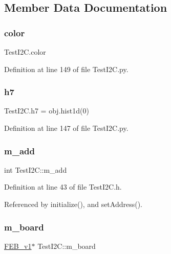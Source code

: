 \subsection{Member Data Documentation}
\mbox{\label{classTestI2C_ad56430c679e365a4b3c7e313119937ae}} 
\subsubsection{\texorpdfstring{color}{color}}
{\footnotesize\ttfamily Test\+I2\+C.\+color}



Definition at line 149 of file Test\+I2\+C.\+py.

\mbox{\label{classTestI2C_a5810c36ed7c1f23edaf77264084b005f}} 
\subsubsection{\texorpdfstring{h7}{h7}}
{\footnotesize\ttfamily Test\+I2\+C.\+h7 = obj.\+hist1d(0)}



Definition at line 147 of file Test\+I2\+C.\+py.

\mbox{\label{classTestI2C_a3dbd7e079a36aa6f476f0e3c0a9bf844}} 
\subsubsection{\texorpdfstring{m\+\_\+add}{m\_add}}
{\footnotesize\ttfamily int Test\+I2\+C\+::m\+\_\+add\hspace{0.3cm}{\ttfamily [private]}}



Definition at line 43 of file Test\+I2\+C.\+h.



Referenced by initialize(), and set\+Address().

\mbox{\label{classTestI2C_adc621a1ca623e2f58a06b65c76722a91}} 
\subsubsection{\texorpdfstring{m\+\_\+board}{m\_board}}
{\footnotesize\ttfamily \hyperlink{classFEB__v1}{F\+E\+B\+\_\+v1}$\ast$ Test\+I2\+C\+::m\+\_\+board\hspace{0.3cm}{\ttfamily [private]}}



